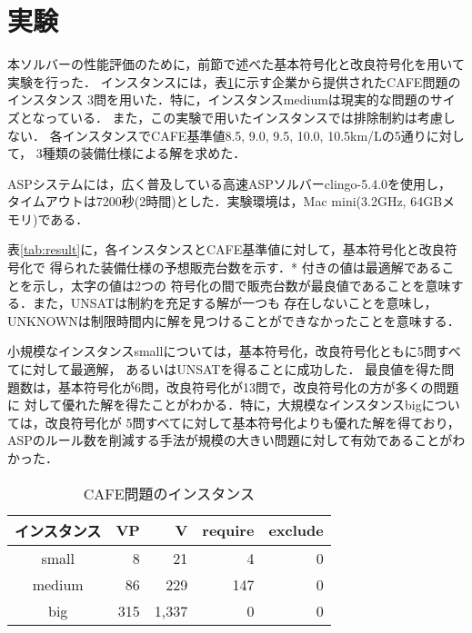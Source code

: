 \section{実験}
本ソルバーの性能評価のために，前節で述べた基本符号化と改良符号化を用いて実験を行った．
インスタンスには，表\ref{tab:instance}に示す企業から提供されたCAFE問題のインスタンス
3問を用いた．特に，インスタンスmediumは現実的な問題のサイズとなっている．
また，この実験で用いたインスタンスでは排除制約は考慮しない．
各インスタンスでCAFE基準値8.5, 9.0, 9.5, 10.0, 10.5km/Lの5通りに対して，
3種類の装備仕様による解を求めた．

ASPシステムには，広く普及している高速ASPソルバーclingo-5.4.0を使用し，
タイムアウトは7200秒(2時間)とした．実験環境は，Mac mini(3.2GHz, 64GBメモリ)である．

表\ref{tab:result}に，各インスタンスとCAFE基準値に対して，基本符号化と改良符号化で
得られた装備仕様の予想販売台数を示す．* 付きの値は最適解であることを示し，太字の値は2つの
符号化の間で販売台数が最良値であることを意味する．また，UNSATは制約を充足する解が一つも
存在しないことを意味し，UNKNOWNは制限時間内に解を見つけることができなかったことを意味する．


小規模なインスタンスsmallについては，基本符号化，改良符号化ともに5問すべてに対して最適解，
あるいはUNSATを得ることに成功した．
最良値を得た問題数は，基本符号化が6問，改良符号化が13問で，改良符号化の方が多くの問題に
対して優れた解を得たことがわかる．特に，大規模なインスタンスbigについては，改良符号化が
5問すべてに対して基本符号化よりも優れた解を得ており，
ASPのルール数を削減する手法が規模の大きい問題に対して有効であることがわかった．


\begin{table}[tb]
 \caption{CAFE問題のインスタンス}
 \centering
 \begin{tabular}{crrrr} \bhline
  インスタンス & VP	& V	& require & exclude	\\\hline
  small	    & 8		& 21	& 4	  & 0	        \\
  medium    & 86	& 229	& 147	  & 0	        \\
  big	    & 315	& 1,337	& 0	  & 0        	\\\hline
 \end{tabular}
 \label{tab:instance}
\end{table}

